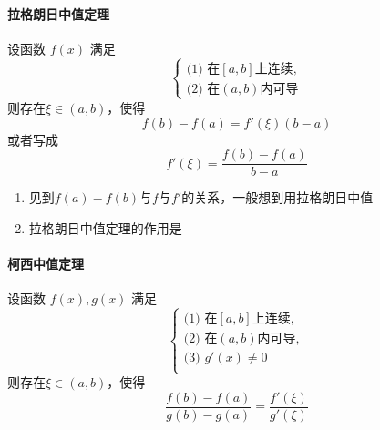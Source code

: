 \documentclass[../book.tex]{subfiles}
\begin{document}
\begin{enumerate}
\begin{itemize}
\begin{circlenum}
                \item $\displaystyle\frac{f''(x)f(x) - [f'(x)]^2}{f^{2}(x)} = [\displaystyle\frac{f'(x)}{f(x)}]'$ \\ $\Rightarrow$见到$f''(x)f(x) - [f'(x)]^2, f(x) \neq 0$，令$F(x) = \displaystyle\frac{f'(x)}{f(x)}$
                \item {\setlength{\baselineskip}{1.4\baselineskip} $\displaystyle\frac{f''(x)f(x) - [f'(x)]^2}{f^2(x)} = [\displaystyle\frac{f'(x)}{f(x)}]' = [\ln f(x)]''$ \\ $\Rightarrow$见到 $f''(x)f(x) - [f'(x)]^2, f(x) > 0$，可考虑令$F(x) = \ln f(x)$
                \item $\displaystyle\frac{f'(x)}{f(x)} = [\ln f(x)]'$
            \end{circlenum}
        \end{itemize}
    \end{enumerate}

    \paragraph{拉格朗日中值定理}

    设函数 $f(x)$ 满足
    \[
        \begin{cases}
            \text{(1) 在} [a, b] \text{上连续},\\
            \text{(2) 在} (a, b) \text{内可导}
        \end{cases}
    \]
    则存在$\xi \in (a, b)$，使得
    \[
        f(b) - f(a) = f'(\xi)(b - a)
    \]
    或者写成
    \[
        f'(\xi) = \frac{f(b) - f(a)}{b - a}
    \]

    \begin{enumerate}
        \item 见到$f(a) - f(b)$与$f$与$f'$的关系，一般想到用拉格朗日中值
        \item 拉格朗日中值定理的作用是{\color{red}{用导函数的值来控制函数值的增减}}
    \end{enumerate}

    \paragraph{柯西中值定理}

    设函数 $f(x), g(x)$ 满足
    \[
        \begin{cases}
            \text{(1) 在} [a, b] \text{上连续},\\
            \text{(2) 在} (a, b) \text{内可导},\\
            \text{(3) } g'(x) \neq 0 \\
        \end{cases}
    \]
    则存在$\xi \in (a, b)$，使得
    \[
        \frac{f(b) - f(a)}{g(b) - g(a)} = \frac{f'(\xi)}{g'(\xi)}
    \]
\end{document}
